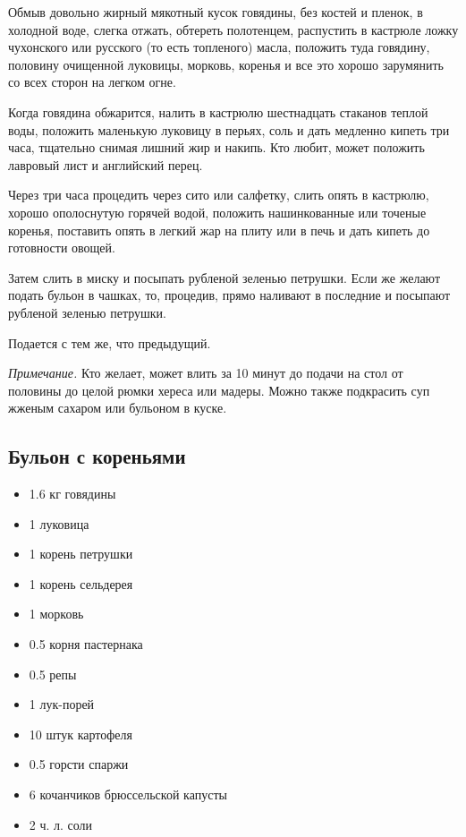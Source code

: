 Обмыв довольно жирный мякотный кусок говядины, без костей и пленок, в холодной воде, слегка отжать, обтереть полотенцем, распустить в кастрюле ложку чухонского или русского (то есть топленого) масла, положить туда говядину, половину очищенной луковицы, морковь, коренья и все это хорошо зарумянить со всех сторон на легком огне.

Когда говядина обжарится, налить в кастрюлю шестнадцать стаканов теплой воды, положить маленькую луковицу в перьях, соль и дать медленно кипеть три часа, тщательно снимая лишний жир и накипь. Кто любит, может положить лавровый лист и английский перец.

Через три часа процедить через сито или салфетку, слить опять в кастрюлю, хорошо ополоснутую горячей водой, положить нашинкованные или точеные коренья, поставить опять в легкий жар на плиту или в печь и дать кипеть до готовности овощей.

Затем слить в миску и посыпать рубленой зеленью петрушки. Если же желают подать бульон в чашках, то, процедив, прямо наливают в последние и посыпают рубленой зеленью петрушки.

Подается с тем же, что предыдущий.

\emph{Примечание.} Кто желает, может влить за 10 минут до подачи на стол от половины до целой рюмки хереса или мадеры. Можно также подкрасить суп жженым сахаром или бульоном в куске.

\subsection{Бульон с кореньями}\label{3bul-korni}

\begin{itemize}
	\item 1.6 кг говядины 
    \item 1 луковица 
    \item 1 корень петрушки 
    \item 1 корень сельдерея 
    \item 1 морковь 
    \item 0.5 корня пастернака 
    \item 0.5 репы 
    \item 1 лук-порей 
    \item 10 штук картофеля 
    \item 0.5 горсти спаржи 
    \item 6 кочанчиков брюссельской капусты 
    \item 2 ч. л. соли
\end{itemize}

